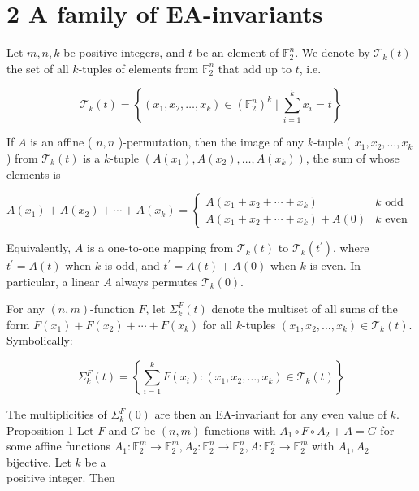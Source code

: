 \documentclass[10pt]{article}
\begin{document}
\section*{2 A family of EA-invariants}
Let $m, n, k$ be positive integers, and $t$ be an element of $\mathbb{F}_{2}^{n}$. We denote by $\mathcal{T}_{k}(t)$ the set of all $k$-tuples of elements from $\mathbb{F}_{2}^{n}$ that add up to $t$, i.e.

$$
\mathcal{T}_{k}(t)=\left\{\left(x_{1}, x_{2}, \ldots, x_{k}\right) \in\left(\mathbb{F}_{2}^{n}\right)^{k} \mid \sum_{i=1}^{k} x_{i}=t\right\}
$$

If $A$ is an affine ( $n, n$ )-permutation, then the image of any $k$-tuple ( $x_{1}, x_{2}, \ldots, x_{k}$ ) from $\mathcal{T}_{k}(t)$ is a $k$-tuple $\left(A\left(x_{1}\right), A\left(x_{2}\right), \ldots, A\left(x_{k}\right)\right)$, the sum of whose elements is

$$
A\left(x_{1}\right)+A\left(x_{2}\right)+\cdots+A\left(x_{k}\right)= \begin{cases}A\left(x_{1}+x_{2}+\cdots+x_{k}\right) & k \text { odd } \\ A\left(x_{1}+x_{2}+\cdots+x_{k}\right)+A(0) & k \text { even }\end{cases}
$$

Equivalently, $A$ is a one-to-one mapping from $\mathcal{T}_{k}(t)$ to $\mathcal{T}_{k}\left(t^{\prime}\right)$, where $t^{\prime}=A(t)$ when $k$ is odd, and $t^{\prime}=A(t)+A(0)$ when $k$ is even. In particular, a linear $A$ always permutes $\mathcal{T}_{k}(0)$.

For any $(n, m)$-function $F$, let $\Sigma_{k}^{F}(t)$ denote the multiset of all sums of the form $F\left(x_{1}\right)+ F\left(x_{2}\right)+\cdots+F\left(x_{k}\right)$ for all $k$-tuples $\left(x_{1}, x_{2}, \ldots, x_{k}\right) \in \mathcal{T}_{k}(t)$. Symbolically:

$$
\Sigma_{k}^{F}(t)=\left\{\sum_{i=1}^{k} F\left(x_{i}\right):\left(x_{1}, x_{2}, \ldots, x_{k}\right) \in \mathcal{T}_{k}(t)\right\}
$$

The multiplicities of $\Sigma_{k}^{F}(0)$ are then an EA-invariant for any even value of $k$.\\
Proposition 1 Let $F$ and $G$ be $(n, m)$-functions with $A_{1} \circ F \circ A_{2}+A=G$ for some affine functions $A_{1}: \mathbb{F}_{2}^{m} \rightarrow \mathbb{F}_{2}^{m}, A_{2}: \mathbb{F}_{2}^{n} \rightarrow \mathbb{F}_{2}^{n}, A: \mathbb{F}_{2}^{n} \rightarrow \mathbb{F}_{2}^{m}$ with $A_{1}, A_{2}$ bijective. Let $k$ be a\\
positive integer. Then
\end{document}
